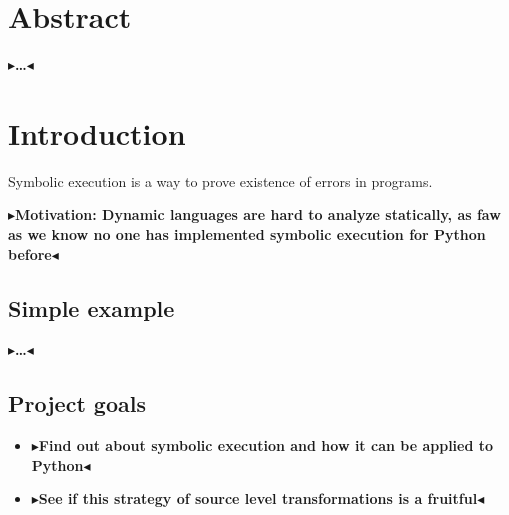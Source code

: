 \documentclass[11pt]{report}
\newcommand{\todo}[1]{{\color[rgb]{.5,0,0}\textbf{$\blacktriangleright$#1$\blacktriangleleft$}}}
\begin{document}

\pagestyle{empty} 
\vspace*{\fill}
\clearpage


\pagestyle{plain}
\chapter*{Abstract}
\todo{\dots}

\setcounter{tocdepth}{1}
\tableofcontents
{}
\setcounter{secnumdepth}{2}


\chapter{Introduction}
\label{ch:intro}

Symbolic execution is a way to prove existence of errors in programs.

\todo{Motivation: Dynamic languages are hard to analyze statically, as
  faw as we know no one has implemented symbolic execution for Python
  before}

\section{Simple example}
\todo{\dots}

\section{Project goals}
\begin{itemize}
  \item \todo{Find out about symbolic execution and how it can be
    applied to Python}
  \item \todo{See if this strategy of source level transformations is
    a fruitful}
\end{itemize}
\end{document}
